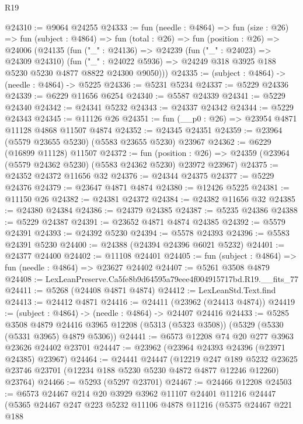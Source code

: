 \begin{lexlean}{R19}
\begin{coremodule}
@24310 := @9064 @24255
@24333 := fun (needle : @4864) =>
  fun (size : @26) =>
  fun (subject : @4864) =>
  fun (total : @26) =>
  fun (position : @26) =>
  @24006
    (@24135
      (fun ("_" : @24136) =>
      @24239
        (fun ("_" : @24023) => @24309 @24310)
        (fun ("_" : @24022 @5936) => @24249 @318 @3925 @188 @5230 @5230 @4877 @8822 @24300 @9050)))
@24335 := (subject : @4864) -> (needle : @4864) -> @5225
@24336 := @5231 @5234
@24337 := @5229 @24336
@24339 := @6229 @11656 @6254
@24340 := @5587 @24339
@24341 := @5229 @24340
@24342 := @24341 @5232
@24343 := @24337 @24342
@24344 := @5229 @24343
@24345 := @11126 @26
@24351 := fun (__p0 : @26) => @23954 @4871 @11128 @4868 @11507 @4874
@24352 := @24345 @24351
@24359 := @23964 (@5579 @23655 @5230) (@5583 @23655 @5230) @23967
@24362 := @6229 (@16899 @11128) @11507
@24372 := fun (position : @26) =>
  @24359 (@23964 (@5579 @24362 @5230) (@5583 @24362 @5230) @23972 @23967)
@24375 := @24352 @24372 @11656 @32
@24376 := @24344 @24375
@24377 := @5229 @24376
@24379 := @23647 @4871 @4874
@24380 := @12426 @5225
@24381 := @11150 @26
@24382 := @24381 @24372
@24384 := @24382 @11656 @32
@24385 := @24380 @24384
@24386 := @24379 @24385
@24387 := @5235 @24386
@24388 := @5229 @24387
@24391 := @23652 @4871 @4874 @24385
@24392 := @5579 @24391
@24393 := @24392 @5230
@24394 := @5578 @24393
@24396 := @5583 @24391 @5230
@24400 := @24388 (@24394 @24396 @6021 @5232)
@24401 := @24377 @24400
@24402 := @11108 @24401
@24405 := fun (subject : @4864) => fun (needle : @4864) => @23627 @24402
@24407 := @5261 @3508 @4879
@24408 := LexLeanPreserve.Ca5fe8b9d64595a79eee4f004915717bd.R19.__fits_77
@24411 := @5268 (@24408 @4871 @4874)
@24412 := LexLeanStd.Text.find
@24413 := @24412 @4871
@24416 := @24411 (@23962 (@24413 @4874))
@24419 := (subject : @4864) -> (needle : @4864) -> @24407 @24416
@24433 := @5285
    @3508
    @4879
    @24416
    @3965
    @12208
    (@5313 (@5323 @3508))
    (@5329 (@5330 (@5331 @3965) @4879 @5306))
@24441 := @6573 @12208 @74 @20 @277 @3963 @23626 @24402 @23701
@24447 := @23962 (@23964 @24393 @24396 (@23971 @24385) @23967)
@24464 := @24441
    @24447
    (@12219
      @247
      @189
      @5232
      @23625
      @23746
      @23701
      (@12234 @188 @5230 @5230 @4872 @4877 @12246 @12260)
      @23764)
@24466 := @5293 (@5297 @23701)
@24467 := @24466 @12208
@24503 := @6573
    @24467
    @214
    @20
    @3929
    @3962
    @11107
    @24401
    @11216
    @24447
    (@5365
      @24467
      @247
      @223
      @5232
      @11106
      @4878
      @11216
      (@5375
        @24467
        @221
        @188

\end{coremodule}
\end{lexlean}
